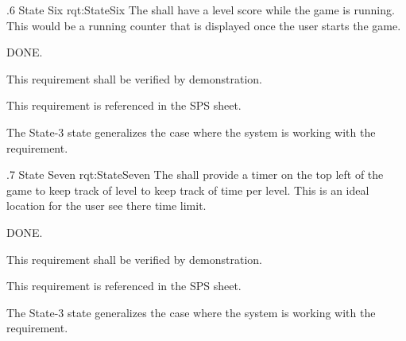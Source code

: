 \ONERQMTV
{\RqtNumberBase.6}
{State Six}
{rqt:StateSix}
{The \ThisSys shall have a level score while the game is running. This would be a running counter that is displayed once the user starts the game.}
{
	\item [Phase 1] DONE.
}
{This requirement shall be verified by demonstration.}
{
	\item [SPS] This requirement is referenced in the SPS sheet.
}
{
	\item The State-3 state generalizes the case where the system is working with the requirement.
}


\ONERQMTV
{\RqtNumberBase.7}
{State Seven}
{rqt:StateSeven}
{The \ThisSys shall provide a timer on the top left of the game to keep track of level to keep track of time per level. This is an ideal location for the user see there time limit.}
{
	\item [Phase 1] DONE.

}
{This requirement shall be verified by demonstration.}
{
	\item [SPS] This requirement is referenced in the SPS sheet.
}
{
	\item The State-3 state generalizes the case where the system is working with the requirement.
}



